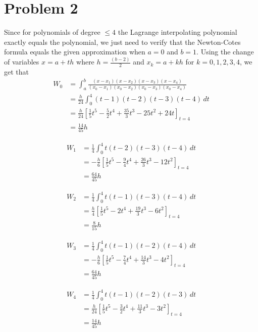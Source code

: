 \documentclass{article}
\begin{document}
\section*{Problem 2}
Since for polynomials of degree $\leq 4$ the Lagrange interpolating polynomial exactly
equals the polynomial, we just need to verify that the Newton-Cotes formula equals the given approximation
when $a=0$ and $b=1$.
Using the change of variables $x = a + th$ where $h = \frac{(b-2)}{2}$ and $x_k = a+kh$ for $k = 0,1,2,3,4$,
we get that
\begin{align*}
	W_0 &= \int_a^b \frac{(x-x_1)(x-x_2)(x-x_3)(x-x_4)}{(x_0-x_1)(x_0-x_2)(x_0-x_3)(x_0-x_4)} \\
	&= \frac{h}{24} \int_0^4 (t-1)(t-2)(t-3)(t-4) \,dt \\
	&= \frac{h}{24} \left[\frac{1}{5}t^5 - \frac{5}{2}t^4 + \frac{35}{3}t^3 - 25t^2 +24t\right]_{t=4} \\
	&= \frac{14}{45}h
\end{align*}

\begin{align*}
	W_1 &= \frac{1}{4} \int_0^4 t(t-2)(t-3)(t-4) \,dt \\
	&= -\frac{h}{6} \left[\frac{1}{5}t^5 - \frac{9}{4}t^4 + \frac{26}{3}t^3 - 12t^2\right]_{t=4} \\
	&= \frac{64}{45}h
\end{align*}

\begin{align*}
	W_2 &= \frac{1}{4} \int_0^4 t(t-1)(t-3)(t-4) \,dt \\
	&= \frac{h}{4} \left[\frac{1}{5}t^5 - 2t^4 + \frac{19}{3}t^3 - 6t^2\right]_{t=4} \\
	&= \frac{8}{15}h
\end{align*}

\begin{align*}
	W_3 &= \frac{1}{4} \int_0^4 t(t-1)(t-2)(t-4) \,dt \\
	&= -\frac{h}{6} \left[\frac{1}{5}t^5 - \frac{7}{4}t^4 + \frac{14}{3}t^3 - 4t^2\right]_{t=4} \\
	&= \frac{64}{45}h
\end{align*}

\begin{align*}
	W_4 &= \frac{1}{4} \int_0^4 t(t-1)(t-2)(t-3) \,dt \\
	&= \frac{h}{24} \left[\frac{1}{5}t^5 - \frac{3}{2}t^4 + \frac{11}{3}t^3 - 3t^2\right]_{t=4} \\
	&= \frac{14}{45}h
\end{align*}
\end{document}
